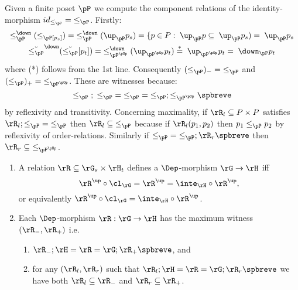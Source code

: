 \documentclass{article}
\begin{document}
\begin{example}
Given a finite poset $\pP$ we compute the component relations of the  identity-morphism $id_{\leq_\pP} = \; \leq_\pP$. Firstly:
\[
\begin{tabular}{c}
$\leq_\pP^\down(\leq_\pP[p_s])
= \; \leq_\pP^\down(\up_\pP p_s)
= \{ p \in P : \; \up_\pP p \subseteq \; \up_\pP p_s)
= \; \up_\pP p_s$
\\[1ex]
$\breve{\leq_\pP}^\down(\breve{\leq_\pP}[p_t])
= \; \leq_{\pP^{\pOp}}^\down(\up_{\pP^{\pOp}} p_t)
\stackrel{*}{=} \; \up_{\pP^{\pOp}} p_t
= \; \down_\pP p_t$
\end{tabular}
\]
where (*) follows from the 1st line. Consequently $(\leq_\pP)_- =  \; \leq_\pP$ and $(\leq_\pP)_+ = \; \leq_{\pP^{\pOp}}$. These are witnesses  because:
\[
\leq_\pP \; ; \; \leq_\pP \; = \; \leq_\pP \; = \; \leq_\pP ; \leq_{\pP^{\pOp}}\spbreve
\]
by reflexivity and transitivity. Concerning maximality, if $\rR_l \subseteq P \times P$ satisfies  $\rR_l ;  \leq_\pP \; = \; \leq_\pP$ then $\rR_l  \subseteq \; \leq_\pP$ because if $\rR_l(p_1,p_2)$ then $p_1 \leq_\pP p_2$ by reflexivity of order-relations. Similarly if $\leq_\pP \; = \; \leq_\pP ; \rR_r\spbreve$ then $\rR_r \subseteq \; \leq_{\pP^{\pOp}}$. \endbox
\end{example}

\smallskip

\begin{lemma}
  \label{lem:bicliq_mor_char_max_witness}
  \item
  \begin{enumerate}
  \item
  A relation $\rR \subseteq \rG_s \times \rH_t$ defines a $\Dep$-morphism $\rG \to \rH$ iff
  \[
  \rR^\up \circ \cl_\rG = \rR^\up = \inte_\rH \circ \rR^\up,
  \]
  or equivalently $\rR^\up \circ \cl_\rG = \inte_\rH \circ \rR^\up$.
  
  \item
  Each $\Dep$-morphism $\rR : \rG \to \rH$ has the maximum witness $(\rR_-,\rR_+)$ i.e.\ 
  \begin{enumerate}
  \item
  $\rR_- ; \rH = \rR = \rG ; \rR_+\spbreve$, and 
  \item
  for any $(\rR_l,\rR_r)$ such that $\rR_l ; \rH = \rR = \rG ; \rR_r\spbreve$ we have both $\rR_l \subseteq \rR_-$ and $\rR_r \subseteq \rR_+$.
  \end{enumerate}
  \end{enumerate}
  \end{lemma}
  
\end{document}

